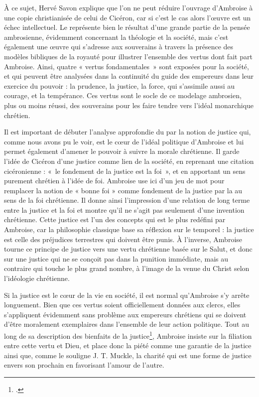 À ce sujet, Hervé Savon explique que l'on ne peut réduire l'ouvrage d'Ambroise à une copie christianisée de celui de Cicéron, car si c'est le cas alors l'œuvre est un échec intellectuel\autocite[247]{savon_ambroise}. Le  représente bien le résultat d'une grande partie de la pensée ambrosienne, évidemment concernant la théologie et la société, mais c'est également une œuvre qui s'adresse aux souverains à travers la présence des modèles bibliques de la royauté pour illustrer l'ensemble des vertus dont fait part Ambroise. Ainsi, quatre « vertus fondamentales\autocite[\nopp I, 115]{ambroise_devoirs_1}~» sont exposées pour la société, et qui peuvent être analysées dans la continuité du guide des empereurs dans leur exercice du pouvoir : la prudence, la justice, la force, qui s'assimile aussi au courage, et la tempérance. Ces vertus sont le socle de ce modelage ambrosien, plus ou moins réussi, des souverains pour les faire tendre vers l'idéal monarchique chrétien.

\bigskip

Il est important de débuter l'analyse approfondie du  par la notion de justice qui, comme nous avons pu le voir, est le cœur de l'idéal politique d'Ambroise et lui permet également d'amener le pouvoir à suivre la morale chrétienne. Il garde l'idée de Cicéron d'une justice comme lien de la société, en reprenant une citation cicéronienne : «~le fondement de la justice est la foi~», et en apportant un sens purement chrétien à l'idée de foi\autocite{markus_peres_1993}. Ambroise use ici d'un jeu de mot pour remplacer la notion de « bonne foi » comme fondement de la justice par la  au sens de la foi chrétienne\autocite[I, note 16 page 256]{ambroise_devoirs_1}. Il donne ainsi l'impression d'une relation de long terme entre la justice et la foi et montre qu'il ne s'agit pas seulement d'une invention chrétienne. Cette justice est l'un des concepts qui est le plus redéfini par Ambroise, car la philosophie classique base sa réflexion sur le temporel : la justice est celle des préjudices terrestres qui doivent être punis. À l'inverse, Ambroise tourne ce principe de justice vers une vertu chrétienne basée sur le Salut, et donc sur une justice qui ne se conçoit pas dans la punition immédiate, mais au contraire qui touche le plus grand nombre, à l'image de la venue du Christ selon l'idéologie chrétienne\autocite[673]{dvornik_political}.

\bigskip

Si la justice est le cœur de la vie en société, il est normal qu'Ambroise s'y arrête longuement. Bien que ces vertus soient officiellement données aux clercs, elles s'appliquent évidemment sans problème aux empereurs chrétiens qui se doivent d'être moralement exemplaires dans l'ensemble de leur action politique. Tout au long de sa description des bienfaits de la justice\footnote{\cite[\nopp I, 130-142]{ambroise_devoirs_1}.}, Ambroise insiste sur la filiation entre cette vertu et Dieu, et place donc la piété comme une garantie de la justice ainsi que, comme le souligne J. T. Muckle, la charité qui est une forme de justice envers son prochain en favorisant l'amour de l'autre\autocite{muckle_officiis}.


